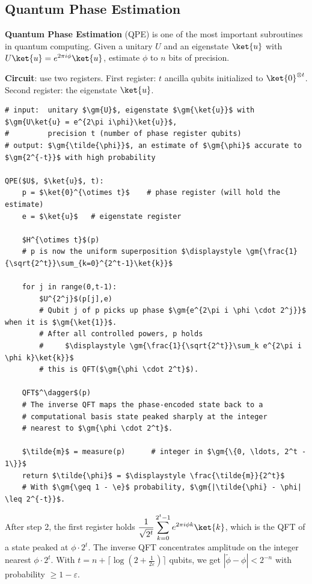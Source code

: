 \documentclass[oneside]{academica}
\begin{document}
\subsection{Quantum Phase Estimation}

\textbf{Quantum Phase Estimation} (QPE) is one of the most important subroutines in quantum computing.
Given a unitary $U$ and an eigenstate $\ket{u}$ with $U\ket{u}=e^{2\pi i\phi}\ket{u}$, estimate $\phi$ to $n$ bits of precision.

\textbf{Circuit}: use two registers.
First register: $t$ ancilla qubits initialized to $\ket{0}^{\otimes t}$.
Second register: the eigenstate $\ket{u}$.

\begin{lstlisting}
# input:  unitary $\gm{U}$, eigenstate $\gm{\ket{u}}$ with $\gm{U\ket{u} = e^{2\pi i\phi}\ket{u}}$,
#         precision t (number of phase register qubits)
# output: $\gm{\tilde{\phi}}$, an estimate of $\gm{\phi}$ accurate to $\gm{2^{-t}}$ with high probability

QPE($U$, $\ket{u}$, t):
    p = $\ket{0}^{\otimes t}$    # phase register (will hold the estimate)
    e = $\ket{u}$   # eigenstate register

    $H^{\otimes t}$(p)
    # p is now the uniform superposition $\displaystyle \gm{\frac{1}{\sqrt{2^t}}\sum_{k=0}^{2^t-1}\ket{k}}$

    for j in range(0,t-1):
        $U^{2^j}$(p[j],e)
        # Qubit j of p picks up phase $\gm{e^{2\pi i \phi \cdot 2^j}}$ when it is $\gm{\ket{1}}$.
        # After all controlled powers, p holds
        #     $\displaystyle \gm{\frac{1}{\sqrt{2^t}}\sum_k e^{2\pi i \phi k}\ket{k}}$
        # this is QFT($\gm{\phi \cdot 2^t}$).

    QFT$^\dagger$(p)
    # The inverse QFT maps the phase-encoded state back to a
    # computational basis state peaked sharply at the integer
    # nearest to $\gm{\phi \cdot 2^t}$.

    $\tilde{m}$ = measure(p)      # integer in $\gm{\{0, \ldots, 2^t - 1\}}$
    return $\tilde{\phi}$ = $\displaystyle \frac{\tilde{m}}{2^t}$
    # With $\gm{\geq 1 - \e}$ probability, $\gm{|\tilde{\phi} - \phi| \leq 2^{-t}}$.
\end{lstlisting}

After step 2, the first register holds $\displaystyle \frac{1}{\sqrt{2^t}}\sum_{k=0}^{2^t-1}e^{2\pi i\phi k}\ket{k}$, which is the QFT of a state peaked at $\phi\cdot 2^t$.
The inverse QFT concentrates amplitude on the integer nearest $\phi\cdot 2^t$.
With $\displaystyle t=n+\lceil\log(2+\frac{1}{2\varepsilon})\rceil$ qubits, we get $|\tilde\phi-\phi|<2^{-n}$ with probability $\ge1-\varepsilon$.
\end{document}
